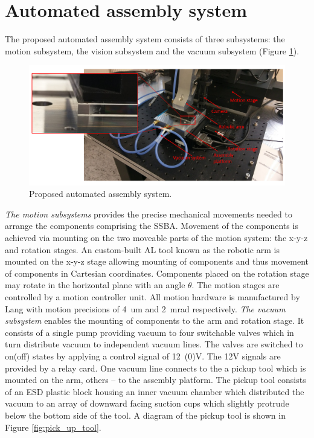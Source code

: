 \section{Automated assembly system}

The proposed automated assembly system consists of three subsystems: the motion subsystem, the vision subsystem and the vacuum subsystem (Figure \ref{fig:auto_assembly_system})\cite{AutomatedAssembly_tutorial}.

\begin{figure}[ht]\centering
\includegraphics[width=1\linewidth]{Data/Module_assembly/Automated_assembly_system.png}
\caption{Proposed automated assembly system.}
\label{fig:auto_assembly_system}
\end{figure}

\emph{The motion subsystems} provides the precise mechanical movements needed to arrange the components comprising the SSBA. Movement of the components is achieved via mounting on the two moveable parts of the motion system: the x-y-z and rotation stages. An custom-built AL tool known as the robotic arm is mounted on the x-y-z stage allowing mounting of components and thus movement of components in Cartesian coordinates. Components placed on the rotation stage may rotate in the horizontal plane with an angle $\theta$. The motion stages are controlled by a motion controller unit. All motion hardware is manufactured by Lang with motion precisions of 4~um and 2~mrad respectively. \emph{The vacuum subsystem} enables the mounting of components to the arm and rotation stage. It consists of a single pump providing vacuum to four switchable valves which in turn distribute vacuum to independent vacuum lines. The valves are switched to on(off) states by applying a control signal of 12~(0)V. The 12V signals are provided by a relay card. One vacuum line connects to the a pickup tool which is mounted on the arm, others -- to the assembly platform. The pickup tool consists of an ESD plastic block housing an inner vacuum chamber which distributed the vacuum to an array of downward facing suction cups which slightly protrude below the bottom side of the tool. A diagram of the pickup tool is shown in Figure \ref{fig:pick_up_tool}.

